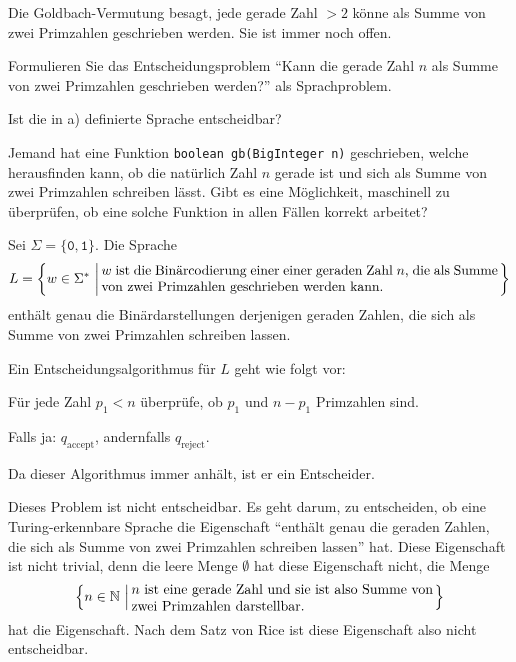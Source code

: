 Die Goldbach-Vermutung besagt, jede gerade Zahl $> 2$ könne als Summe von
zwei Primzahlen geschrieben werden. Sie ist immer noch offen.
\begin{teilaufgaben}
\item Formulieren Sie das Entscheidungsproblem ``Kann die gerade Zahl $n$
als Summe von zwei Primzahlen geschrieben werden?'' als Sprachproblem.
\item Ist die in a) definierte Sprache entscheidbar?
\item Jemand hat eine Funktion \texttt{boolean gb(BigInteger n)} geschrieben,
welche herausfinden kann, ob die natürlich Zahl $n$ gerade ist und sich
als Summe von zwei Primzahlen schreiben lässt. Gibt es eine Möglichkeit,
maschinell zu überprüfen, ob eine solche Funktion in allen Fällen
korrekt arbeitet?
\end{teilaufgaben}

\begin{loesung}
\begin{teilaufgaben}
\item Sei $\Sigma=\{\texttt{0},\texttt{1}\}$. Die Sprache
\[
L=\left\{ w\in\Sigma^*\,\left|\, \begin{minipage}{4truein}
$w$ ist die Binärcodierung einer einer geraden Zahl $n$, die
als Summe von zwei Primzahlen geschrieben werden kann.
\end{minipage}
\right.\right\}
\]
enthält genau die Binärdarstellungen derjenigen geraden Zahlen,
die sich als Summe von zwei Primzahlen schreiben lassen.
\item Ein Entscheidungsalgorithmus für $L$ geht wie folgt vor:
\begin{compactenum}
\item Für jede Zahl $p_1<n$ überprüfe, ob $p_1$ und $n-p_1$ Primzahlen
sind.
\item Falls ja: $q_{\text{accept}}$, andernfalls $q_{\text{reject}}$.
\end{compactenum}
Da dieser Algorithmus immer anhält, ist er ein Entscheider.
\item Dieses Problem ist nicht entscheidbar.
Es geht darum, zu entscheiden, ob eine Turing-erkennbare Sprache
die Eigenschaft
``enthält genau die geraden Zahlen, die sich als Summe von zwei Primzahlen
schreiben lassen''
hat.
Diese Eigenschaft ist nicht trivial, denn die leere Menge $\emptyset$ hat
diese Eigenschaft nicht, die Menge
\[
\left\{ n\in\mathbb N\,\left|\,
\begin{minipage}{3truein}
$n$ ist eine gerade Zahl und sie ist also Summe von zwei Primzahlen
darstellbar.
\end{minipage}\right.\right\}
\]
hat die Eigenschaft.
Nach dem Satz von Rice ist diese Eigenschaft also nicht entscheidbar.
\qedhere
\end{teilaufgaben}
\end{loesung}

